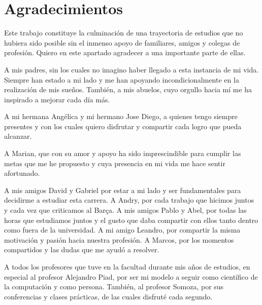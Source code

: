 \chapter*{Agradecimientos}\label{chapter:agradecimientos}

Este trabajo constituye la culminación de una trayectoria de estudios que no hubiera sido posible sin el inmenso apoyo de familiares, amigos y colegas de profesión. Quiero en este apartado agradecer a una importante parte de ellas.

	A mis padres, sin los cuales no imagino haber llegado a esta instancia de mi vida. Siempre han estado a mi lado y me han apoyando incondicionalmente en la realización de mis sueños. También, a mis abuelos, cuyo orgullo hacia mí me ha inspirado a mejorar cada día más.

	A mi hermana Angélica y mi hermano Jose Diego, a quienes tengo siempre presentes y con los cuales quiero disfrutar y compartir cada logro que pueda alcanzar.

	A Marian, que con su amor y apoyo ha sido imprescindible para cumplir las metas que me he propuesto y cuya presencia en mi vida me hace sentir afortunado.

	A mis amigos David y Gabriel por estar a mi lado y ser fundamentales para decidirme a estudiar esta carrera. A Andry, por cada trabajo que hicimos juntos y cada vez que criticamos al Barça. A mis amigos Pablo y Abel, por todas las horas que estudiamos juntos y el gusto que daba compartir con ellos tanto dentro como fuera de la universidad. A mi amigo Leandro, por compartir la misma motivación y pasión hacia nuestra profesión. A Marcos, por los momentos compartidos y las dudas que me ayudó a resolver.

	A todos los profesores que tuve en la facultad durante mis años de estudios, en especial al profesor Alejandro Piad, por ser mi modelo a seguir como científico de la computación y como persona. También, al profesor Somoza, por sus conferencias y clases prácticas, de las cuales disfruté cada segundo.



